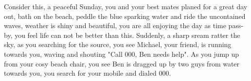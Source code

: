 Consider this, a peaceful Sunday, you and your best mates planed for a great day out, bath on the beach, peddle the blue sparking water and ride the uncontained waves, weather is shiny and beautiful, you are all enjoying the day as time pass-by, you feel life can not be better than this. Suddenly, a sharp sream ratter the sky, as you searching for the source, you see Michael, your friend, is running towards you, waving and shouting "Call 000, Ben needs help". As you jump up from your cosy beach chair, you see Ben is dragged up by two guys from water towards you, you search for your mobile and dialed 000. 